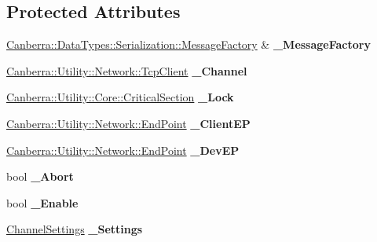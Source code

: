 \subsection*{Protected Attributes}
\begin{DoxyCompactItemize}
\item 
\mbox{\label{class_canberra_1_1_protocols_1_1_lynx_1_1_stream_channel_a29005e3c78c4a32ca39a4570089ae89a}} 
\hyperlink{class_canberra_1_1_data_types_1_1_serialization_1_1_message_factory}{Canberra\+::\+Data\+Types\+::\+Serialization\+::\+Message\+Factory} \& {\bfseries \+\_\+\+Message\+Factory}
\item 
\mbox{\label{class_canberra_1_1_protocols_1_1_lynx_1_1_stream_channel_a73bfc7cfc5123819de001959489db3fa}} 
\hyperlink{class_canberra_1_1_utility_1_1_network_1_1_tcp_client}{Canberra\+::\+Utility\+::\+Network\+::\+Tcp\+Client} {\bfseries \+\_\+\+Channel}
\item 
\mbox{\label{class_canberra_1_1_protocols_1_1_lynx_1_1_stream_channel_af9125122398b284775efd5b9c21dcd70}} 
\hyperlink{class_canberra_1_1_utility_1_1_core_1_1_critical_section}{Canberra\+::\+Utility\+::\+Core\+::\+Critical\+Section} {\bfseries \+\_\+\+Lock}
\item 
\mbox{\label{class_canberra_1_1_protocols_1_1_lynx_1_1_stream_channel_af4852e2bf0fd7651f05da290b5f03f27}} 
\hyperlink{class_canberra_1_1_utility_1_1_network_1_1_end_point}{Canberra\+::\+Utility\+::\+Network\+::\+End\+Point} {\bfseries \+\_\+\+Client\+EP}
\item 
\mbox{\label{class_canberra_1_1_protocols_1_1_lynx_1_1_stream_channel_a1c211e7e773d99652ac6ad61044d8ed1}} 
\hyperlink{class_canberra_1_1_utility_1_1_network_1_1_end_point}{Canberra\+::\+Utility\+::\+Network\+::\+End\+Point} {\bfseries \+\_\+\+Dev\+EP}
\item 
\mbox{\label{class_canberra_1_1_protocols_1_1_lynx_1_1_stream_channel_a621168cb972c11354bd443eae5a3d6e0}} 
bool {\bfseries \+\_\+\+Abort}
\item 
\mbox{\label{class_canberra_1_1_protocols_1_1_lynx_1_1_stream_channel_a830d4d2a6a2791e8b40ab1926a06b4ea}} 
bool {\bfseries \+\_\+\+Enable}
\item 
\mbox{\label{class_canberra_1_1_protocols_1_1_lynx_1_1_stream_channel_a2beb3080b29ab6cfe4ff9e993b2ce87d}} 
\hyperlink{class_canberra_1_1_protocols_1_1_lynx_1_1_channel_settings}{Channel\+Settings} {\bfseries \+\_\+\+Settings}
\end{DoxyCompactItemize}


